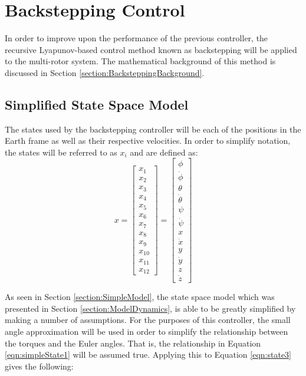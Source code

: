 \FloatBarrier
\section{Backstepping Control}
In order to improve upon the performance of the previous controller, the recursive Lyapunov-based control method known as backstepping will be applied to the multi-rotor system. The mathematical background of this method is discussed in Section \ref{section:BacksteppingBackground}.
\subsection{Simplified State Space Model}
The states used by the backstepping controller will be each of the positions in the Earth frame as well as their respective velocities. In order to simplify notation, the states will be referred to as $x_{i}$ and are defined as:
\begin{equation}\label{eqn:stateDef}
x=
\begin{bmatrix}
x_{1}\\
x_{2}\\
x_{3}\\
x_{4}\\
x_{5}\\
x_{6}\\
x_{7}\\
x_{8}\\
x_{9}\\
x_{10}\\
x_{11}\\
x_{12}
\end{bmatrix}
=
\begin{bmatrix}
\phi\\
\dot{\phi}\\
\theta\\
\dot{\theta}\\
\psi\\
\dot{\psi}\\
x\\
\dot{x}\\
y\\
\dot{y}\\
z\\
\dot{z}
\end{bmatrix}
\end{equation}

As seen in Section \ref{section:SimpleModel}, the state space model which was presented in Section \ref{section:ModelDynamics}, is able to be greatly simplified by making a number of assumptions. For the purposes of this controller, the small angle approximation will be used in order to simplify the relationship between the torques and the Euler angles. That is, the relationship in Equation \ref{eqn:simpleState1} will be assumed true. Applying this to Equation \ref{eqn:state3} gives the following:

